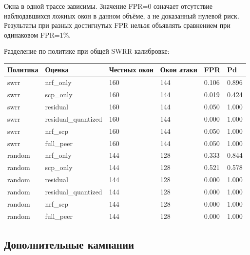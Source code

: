 \documentclass[11pt,a4paper]{article}
\begin{document}
Окна в одной трассе зависимы. Значение FPR=0 означает отсутствие наблюдавшихся ложных окон в данном объёме, а не доказанный нулевой риск. Результаты при разных достигнутых FPR нельзя объявлять сравнением при одинаковом FPR=1\%.

Разделение по политике при общей SWRR-калибровке:

{\footnotesize\setlength{\tabcolsep}{3pt}\renewcommand{\arraystretch}{1.25}
\begin{longtable}{p{2.53cm}p{2.53cm}p{2.53cm}p{2.53cm}p{2.53cm}p{2.53cm}}
\toprule
Политика & Оценка & Честных окон & Окон атаки & FPR & Pd \\
\midrule\endhead
swrr & nrf\_only & 160 & 144 & 0.106 & 0.896 \\
swrr & scp\_only & 160 & 144 & 0.019 & 0.424 \\
swrr & residual & 160 & 144 & 0.050 & 1.000 \\
swrr & residual\_quantized & 160 & 144 & 0.000 & 1.000 \\
swrr & nrf\_scp & 160 & 144 & 0.050 & 1.000 \\
swrr & full\_peer & 160 & 144 & 0.050 & 1.000 \\
random & nrf\_only & 144 & 128 & 0.333 & 0.844 \\
random & scp\_only & 144 & 128 & 0.521 & 0.578 \\
random & residual & 144 & 128 & 0.000 & 1.000 \\
random & residual\_quantized & 144 & 128 & 0.000 & 1.000 \\
random & nrf\_scp & 144 & 128 & 0.000 & 1.000 \\
random & full\_peer & 144 & 128 & 0.000 & 1.000 \\
\bottomrule\end{longtable}}

\subsection*{Дополнительные кампании}
\end{document}
